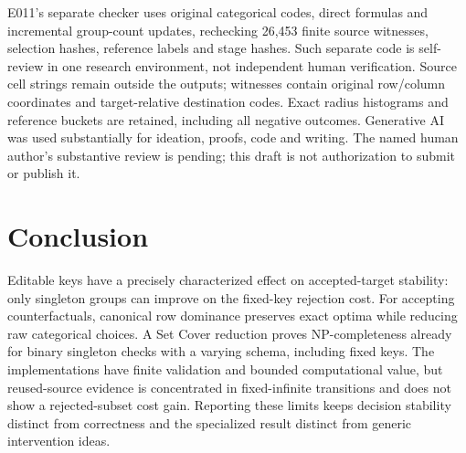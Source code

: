 \documentclass[11pt]{article}
\begin{document}
E011's separate checker uses original categorical codes, direct formulas and
incremental group-count updates, rechecking 26,453 finite source witnesses,
selection hashes, reference labels and stage hashes. Such separate code is
self-review in one research environment, not independent human verification.
Source cell strings remain outside the outputs; witnesses contain original
row/column coordinates and target-relative destination codes. Exact radius
histograms and reference buckets are retained, including all negative outcomes.
Generative AI was used substantially for ideation, proofs, code and writing.
The named human author's substantive review is pending; this draft is not
authorization to submit or publish it.

\section{Conclusion}
Editable keys have a precisely characterized effect on accepted-target
stability: only singleton groups can improve on the fixed-key rejection cost.
For accepting counterfactuals, canonical row dominance preserves exact optima
while reducing raw categorical choices. A Set Cover reduction proves
NP-completeness already for binary singleton checks with a varying schema,
including fixed keys. The implementations have finite
validation and bounded computational value, but reused-source evidence is
concentrated in fixed-infinite transitions and does not show a rejected-subset
cost gain. Reporting these limits keeps decision stability distinct from
correctness and the specialized result distinct from generic intervention ideas.
\end{document}
